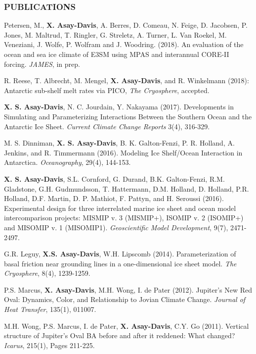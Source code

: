 \documentclass[12pt,letterpaper]{article}
\begin{document}
\begin{flushleft}
\subsubsection*{\color{titleBlue} PUBLICATIONS}
\vspace{-5pt}

\begin{enumerate*}
\item Petersen, M., \textbf{X. Asay-Davis}, A. Berres, D. Comeau, N. Feige, D. Jacobsen, P. Jones, M. Maltrud, T. Ringler, G. Streletz, A. Turner, L. Van Roekel, M. Veneziani, J. Wolfe, P. Wolfram and J. Woodring. (2018). An evaluation of the ocean and sea ice climate of E3SM using MPAS and interannual CORE-II forcing.  \textit{JAMES}, in prep.
\item R. Reese, T. Albrecht, M. Mengel, \textbf{X. Asay-Davis}, and R. Winkelmann (2018): Antarctic sub-shelf melt rates via PICO, \textit{The Cryosphere}, accepted.
\item \textbf{X. S. Asay-Davis}, N. C. Jourdain, Y. Nakayama (2017). Developments in Simulating and Parameterizing Interactions Between the Southern Ocean and the Antarctic Ice Sheet. \textit{Current Climate Change Reports} 3(4), 316-329. 
\item M. S. Dinniman, \textbf{X. S. Asay-Davis}, B. K. Galton-Fenzi, P. R. Holland, A. Jenkins, and R. Timmermann (2016). Modeling Ice Shelf/Ocean Interaction in Antarctica. \textit{Oceanography}, 29(4), 144-153. 
\item \textbf{X. S. Asay-Davis}, S.L. Cornford, G. Durand, B.K. Galton-Fenzi, R.M. Gladstone, G.H. Gudmundsson, T. Hattermann, D.M. Holland, D. Holland, P.R. Holland, D.F. Martin, D. P. Mathiot, F. Pattyn, and H. Seroussi (2016). Experimental design for three interrelated marine ice sheet and ocean model intercomparison projects: MISMIP v. 3 (MISMIP+), ISOMIP v. 2 (ISOMIP+) and MISOMIP v. 1 (MISOMIP1). \textit{Geoscientific Model Development}, 9(7), 2471-2497.
\item G.R. Leguy, \textbf{X.S. Asay-Davis}, W.H. Lipscomb (2014). Parameterization of basal friction near grounding lines in a one-dimensional ice sheet model. \textit{The Cryosphere}, 8(4), 1239-1259.
\item P.S. Marcus, \textbf{X. Asay-Davis}, M.H. Wong, I. de Pater (2012). Jupiter's New Red Oval: Dynamics, Color, and Relationship to Jovian Climate Change. \textit{Journal of Heat Transfer}, 135(1), 011007.
\item M.H. Wong, P.S. Marcus, I. de Pater, \textbf{X. Asay-Davis}, C.Y. Go (2011). Vertical structure of Jupiter's Oval BA before and after it reddened: What changed? \textit{Icarus}, 215(1), Pages 211-225.

\end{enumerate*}
\end{flushleft}
\end{document}
